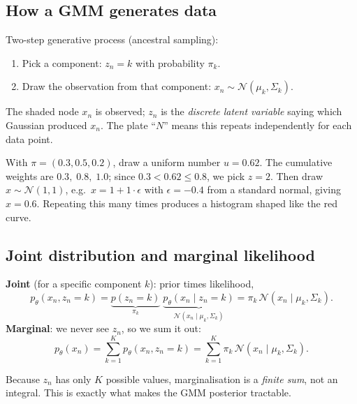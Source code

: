 \documentclass[11pt,a4paper]{article}
\newcommand{\N}{\mathcal{N}}
\begin{document}
\subsection{How a GMM generates data}

\begin{center}
\end{center}

Two-step generative process (ancestral sampling):
\begin{enumerate}[nosep]
\item Pick a component: $z_n=k$ with probability $\pi_k$.
\item Draw the observation from that component: $x_n\sim\N(\mu_k,\Sigma_k)$.
\end{enumerate}
The shaded node $x_n$ is observed; $z_n$ is the \emph{discrete latent variable} saying which Gaussian produced $x_n$. The plate ``$N$'' means this repeats independently for each data point.

\begin{example}
With $\pi=(0.3,0.5,0.2)$, draw a uniform number $u=0.62$. The cumulative weights are $0.3,\;0.8,\;1.0$; since $0.3<0.62\le0.8$, we pick $z=2$. Then draw $x\sim\N(1,1)$, e.g.\ $x=1+1\cdot\epsilon$ with $\epsilon=-0.4$ from a standard normal, giving $x=0.6$. Repeating this many times produces a histogram shaped like the red curve.
\end{example}

\subsection{Joint distribution and marginal likelihood}

\textbf{Joint} (for a specific component $k$): prior times likelihood,
\[
p_\theta(x_n,z_n=k)=\underbrace{p(z_n=k)}_{\pi_k}\;\underbrace{p_\theta(x_n\mid z_n=k)}_{\N(x_n\mid\mu_k,\Sigma_k)}=\pi_k\,\N(x_n\mid\mu_k,\Sigma_k).
\]
\textbf{Marginal}: we never see $z_n$, so we sum it out:
\[
p_\theta(x_n)=\sum_{k=1}^K p_\theta(x_n,z_n=k)=\sum_{k=1}^K\pi_k\,\N(x_n\mid\mu_k,\Sigma_k).
\]
\begin{keyidea}[Important]
Because $z_n$ has only $K$ possible values, marginalisation is a \emph{finite sum}, not an integral. This is exactly what makes the GMM posterior tractable.
\end{keyidea}
\end{document}
